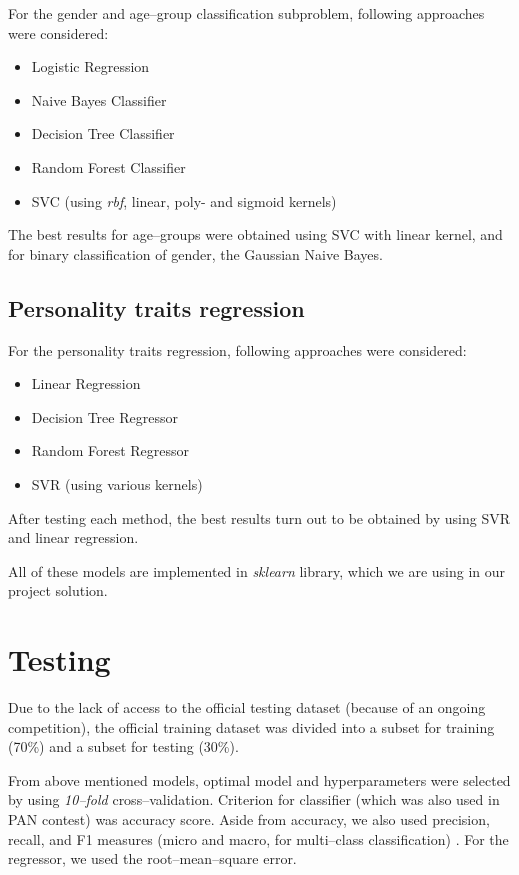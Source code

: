 \documentclass[10pt, a4paper]{article}
\begin{document}
For the gender and age--group classification subproblem, following approaches were considered:
\begin{itemize}
	\item Logistic Regression
	\item Naive Bayes Classifier
	\item Decision Tree Classifier
	\item Random Forest Classifier
	\item SVC (using \textit{rbf}, linear, poly- and sigmoid kernels)
\end{itemize}
\noindent The best results for age--groups were obtained using SVC with linear kernel, and for binary classification of gender, the Gaussian Naive Bayes.

\subsection{Personality traits regression}
For the personality traits regression, following approaches were considered:
\begin{itemize}
	\item Linear Regression
	\item Decision Tree Regressor
	\item Random Forest Regressor
	\item SVR (using various kernels)
\end{itemize}
\noindent After testing each method, the best results turn out to be obtained by using SVR and linear regression.

All of these models are implemented in \textit{sklearn} library, which we are using in our project solution.

\section{Testing}
Due to the lack of access to the official testing dataset (because of an ongoing competition), the official training dataset was divided into a subset for training (70\%) and a subset for testing (30\%).

From above mentioned models, optimal model and hyperparameters were selected by using \textit{10--fold} cross--validation.
Criterion for classifier (which was also used in PAN contest\citep{panoverview}) was accuracy score.
Aside from accuracy, we also used precision, recall, and F1 measures (micro and macro, for multi--class classification) \citep{panoverviewl}.
For the regressor, we used the root--mean--square error.
\end{document}
